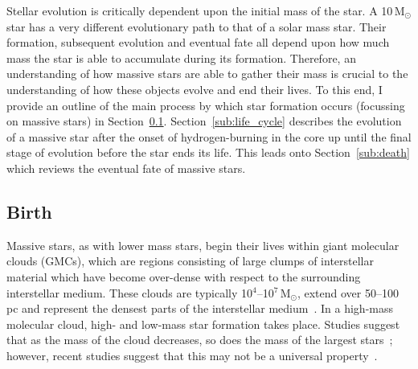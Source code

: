 Stellar evolution is critically dependent upon the initial mass of the star.
A 10\,M$_{\odot}$ star has a very different evolutionary path to that of a solar mass star.
Their formation, subsequent evolution and eventual fate all depend upon how much mass the star is able to accumulate during its formation.
Therefore, an understanding of how massive stars are able to gather their mass is crucial to the understanding of how these objects evolve and end their lives.
To this end, I provide an outline of the main process by which star formation occurs (focussing on massive stars) in Section~\ref{sub:birth}. Section~\ref{sub:life_cycle} describes the evolution of a massive star after the onset of hydrogen-burning in the core up until the final stage of evolution before the star ends its life.
This leads onto Section~\ref{sub:death} which reviews the eventual fate of massive stars.

\subsection{Birth} %
\label{sub:birth}

Massive stars, as with lower mass stars, begin their lives within giant molecular clouds (GMCs), which are regions consisting of large clumps of interstellar material which have become over-dense with respect to the surrounding interstellar medium.
These clouds are typically 10$^{4}$--10$^{7}$\,M$_{\odot}$, extend over 50--100\,pc and represent the densest parts of the interstellar medium~\citep{Fukui10}.
In a high-mass molecular cloud, high- and low-mass star formation takes place.
Studies suggest that as the mass of the cloud decreases, so does the mass of the largest stars~\citep{Fukui10,Weidner10}; however, recent studies suggest that this may not be a universal property~\citep[e.g.][]{Bressert12}.

